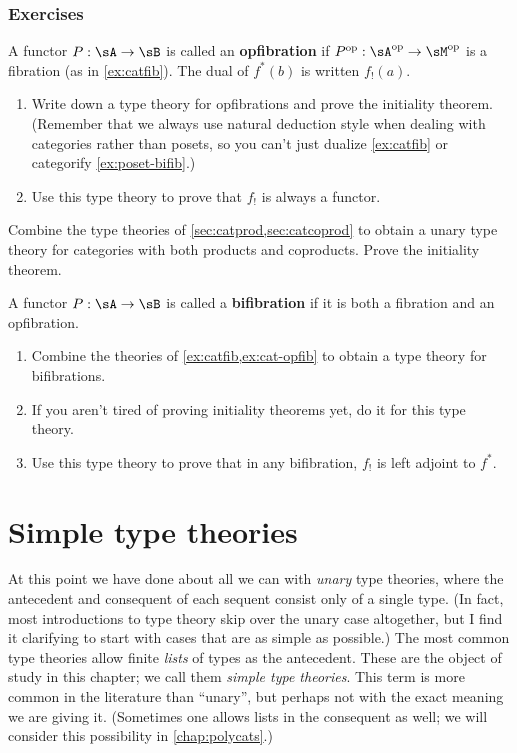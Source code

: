 \documentclass{book}
\begin{document}
\subsection*{Exercises}

\begin{ex}\label{ex:cat-opfib}
  A functor $P:\sA\to\sB$ is called an \textbf{opfibration} if $P\op:\sA\op\to\sM\op$ is a fibration (as in \cref{ex:catfib}).
  The dual of $f^*(b)$ is written $f_!(a)$.
  \begin{enumerate}
  \item Write down a type theory for opfibrations and prove the initiality theorem.
    (Remember that we always use natural deduction style when dealing with categories rather than posets, so you can't just dualize \cref{ex:catfib} or categorify \cref{ex:poset-bifib}.)
  \item Use this type theory to prove that $f_!$ is always a functor.
  \end{enumerate}
\end{ex}

\begin{ex}\label{ex:cat-prod-coprod}
  Combine the type theories of \cref{sec:catprod,sec:catcoprod} to obtain a unary type theory for categories with both products and coproducts.
  Prove the initiality theorem.
\end{ex}

\begin{ex}\label{ex:cat-bifib}
  A functor $P:\sA\to\sB$ is called a \textbf{bifibration} if it is both a fibration and an opfibration.
  \begin{enumerate}
  \item Combine the theories of \cref{ex:catfib,ex:cat-opfib} to obtain a type theory for bifibrations.
  \item If you aren't tired of proving initiality theorems yet, do it for this type theory.
  \item Use this type theory to prove that in any bifibration, $f_!$ is left adjoint to $f^*$.
  \end{enumerate}
\end{ex}

\chapter{Simple type theories}
\label{chap:simple}

At this point we have done about all we can with \emph{unary} type theories, where the antecedent and consequent of each sequent consist only of a single type.
(In fact, most introductions to type theory skip over the unary case altogether, but I find it clarifying to start with cases that are as simple as possible.)
The most common type theories allow finite \emph{lists} of types as the antecedent.
These are the object of study in this chapter; we call them \emph{simple type theories}.
This term is more common in the literature than ``unary'', but perhaps not with the exact meaning we are giving it.
(Sometimes one allows lists in the consequent as well; we will consider this possibility in \cref{chap:polycats}.)
\end{document}
